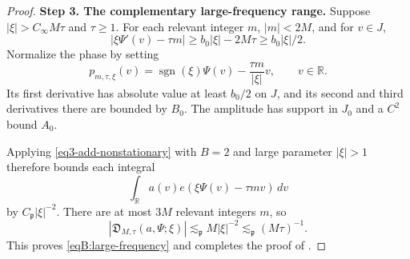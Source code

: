 \documentclass[reqno,12pt]{amsart}
\def \R {\mathbb R}
\numberwithin{equation}{section}
\begin{document}
\begin{proof}
\medskip
\noindent\textbf{Step 3. The complementary large-frequency range.}
Suppose $|\xi|>C_\infty M\tau$ and $\tau\ge1$.
For each relevant integer $m$, $|m|<2M$, and for $v\in J$,
\[
 |\xi\Psi'(v)-\tau m|
 \ge b_0|\xi|-2M\tau\ge b_0|\xi|/2.
\]
Normalize the phase by setting
\[
 p_{m,\tau,\xi}(v)=\operatorname{sgn}(\xi)\Psi(v)
                          -\frac{\tau m}{|\xi|}v,\qquad v\in\R.
\]
Its first derivative has absolute value at least $b_0/2$ on $J$,
and its second and third derivatives there are bounded by $B_0$.
The amplitude has support in $J_0$ and a $C^2$ bound $A_0$.

Applying \eqref{eq3-add-nonstationary} with $B=2$ and large
parameter $|\xi|>1$ therefore bounds each integral $$\int_\R a(v)e(\xi\Psi(v)-\tau mv)\,dv$$ by
$C_{\mathfrak p}|\xi|^{-2}$. There are at most $3M$ relevant
integers $m$, so
\[
 |\mathfrak D_{M,\tau}(a,\Psi;\xi)|
 \lesssim_{\mathfrak p}M|\xi|^{-2}
 \lesssim_{\mathfrak p}{(M\tau)^{-1}}.
\]
This proves \eqref{eqB:large-frequency} and completes the proof of
.
\end{proof}

\end{document}
